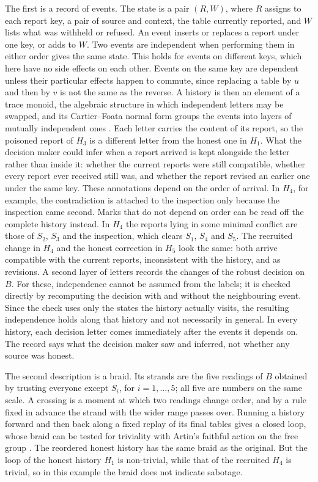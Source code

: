 \documentclass[11pt]{article}
\theoremstyle{definition}\newtheorem{definition}[theorem]{Definition}\newtheorem{remark}[theorem]{Remark}\newtheorem{example}[theorem]{Example}\newtheorem{problem}[theorem]{Open problem}\crefname{problem}{Problem}{Problems}
\begin{document}
The first is a record of events. The state is a pair $(R,W)$, where $R$ assigns to each report key, a pair of source and context, the table currently reported, and $W$ lists what was withheld or refused. An event inserts or replaces a report under one key, or adds to $W$. Two events are independent when performing them in either order gives the same state. This holds for events on different keys, which here have no side effects on each other. Events on the same key are dependent unless their particular effects happen to commute, since replacing a table by $u$ and then by $v$ is not the same as the reverse. A history is then an element of a trace monoid, the algebraic structure in which independent letters may be swapped, and its Cartier--Foata normal form groups the events into layers of mutually independent ones \cite{CartierFoata1969,DiekertRozenberg1995}. Each letter carries the content of its report, so the poisoned report of $H_3$ is a different letter from the honest one in $H_1$. What the decision maker could infer when a report arrived is kept alongside the letter rather than inside it: whether the current reports were still compatible, whether every report ever received still was, and whether the report revised an earlier one under the same key. These annotations depend on the order of arrival. In $H_4$, for example, the contradiction is attached to the inspection only because the inspection came second. Marks that do not depend on order can be read off the complete history instead. In $H_4$ the reports lying in some minimal conflict are those of $S_2$, $S_3$ and the inspection, which clears $S_1$, $S_4$ and $S_5$. The recruited change in $H_4$ and the honest correction in $H_5$ look the same: both arrive compatible with the current reports, inconsistent with the history, and as revisions. A second layer of letters records the changes of the robust decision on $B$. For these, independence cannot be assumed from the labels; it is checked directly by recomputing the decision with and without the neighbouring event. Since the check uses only the states the history actually visits, the resulting independence holds along that history and not necessarily in general. In every history, each decision letter comes immediately after the events it depends on. The record says what the decision maker saw and inferred, not whether any source was honest.

The second description is a braid. Its strands are the five readings of $B$ obtained by trusting everyone except $S_i$, for $i=1,\dots,5$; all five are numbers on the same scale. A crossing is a moment at which two readings change order, and by a rule fixed in advance the strand with the wider range passes over. Running a history forward and then back along a fixed replay of its final tables gives a closed loop, whose braid can be tested for triviality with Artin's faithful action on the free group \cite{Artin1947}. The reordered honest history has the same braid as the original. But the loop of the honest history $H_1$ is non-trivial, while that of the recruited $H_4$ is trivial, so in this example the braid does not indicate sabotage.
\end{document}

